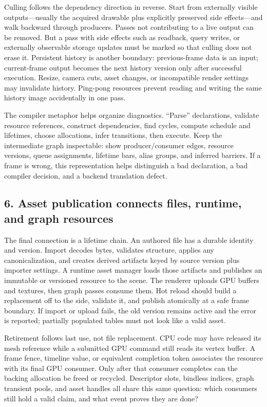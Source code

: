 Culling follows the dependency direction in reverse. Start from externally visible outputs---usually the acquired drawable plus explicitly preserved side effects---and walk backward through producers. Passes not contributing to a live output can be removed. But a pass with side effects such as readback, query writes, or externally observable storage updates must be marked so that culling does not erase it. Persistent history is another boundary: previous-frame data is an input; current-frame output becomes the next history version only after successful execution. Resize, camera cuts, asset changes, or incompatible render settings may invalidate history. Ping-pong resources prevent reading and writing the same history image accidentally in one pass.

The compiler metaphor helps organize diagnostics. ``Parse'' declarations, validate resource references, construct dependencies, find cycles, compute schedule and lifetimes, choose allocations, infer transitions, then execute. Keep the intermediate graph inspectable: show producer/consumer edges, resource versions, queue assignments, lifetime bars, alias groups, and inferred barriers. If a frame is wrong, this representation helps distinguish a bad declaration, a bad compiler decision, and a backend translation defect.

\subsection{6. Asset publication connects files, runtime, and graph resources}\label{asset-publication-connects-files-runtime-and-graph-resources}

The final connection is a lifetime chain. An authored file has a durable identity and version. Import decodes bytes, validates structure, applies any canonicalization, and creates derived artifacts keyed by source version plus importer settings. A runtime asset manager loads those artifacts and publishes an immutable or versioned resource to the scene. The renderer uploads GPU buffers and textures, then graph passes consume them. Hot reload should build a replacement off to the side, validate it, and publish atomically at a safe frame boundary. If import or upload fails, the old version remains active and the error is reported; partially populated tables must not look like a valid asset.

Retirement follows last use, not file replacement. CPU code may have released its mesh reference while a submitted GPU command still reads its vertex buffer. A frame fence, timeline value, or equivalent completion token associates the resource with its final GPU consumer. Only after that consumer completes can the backing allocation be freed or recycled. Descriptor slots, bindless indices, graph transient pools, and asset handles all share this same question: which consumers still hold a valid claim, and what event proves they are done?

